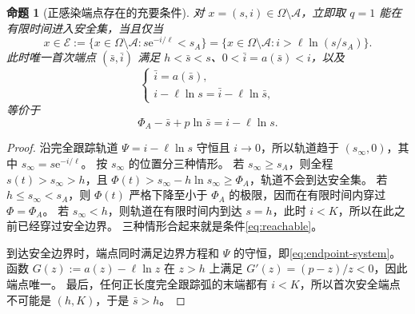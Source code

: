 \documentclass[11pt,a4paper,UTF8]{ctexart}
\newtheorem{proposition}[theorem]{命题}
\theoremstyle{definition}
\newcommand{\Acal}{\mathcal A}
\newcommand{\e}{\mathrm e}
\begin{document}
\begin{proposition}[正感染端点存在的充要条件]
\label{prop:reachable}
对 $x=(s,i)\in\Omega\setminus\Acal$，立即取 $q=1$ 能在有限时间进入安全集，当且仅当
\begin{equation}
x\in\mathcal E:=\{x\in\Omega\setminus\Acal:s\e^{-i/\ell}<s_A\}
=\{x\in\Omega\setminus\Acal:i>\ell\ln(s/s_A)\}.
\label{eq:reachable}
\end{equation}
此时唯一首次端点 $(\bar s,\bar i)$ 满足 $h<\bar s<s$、$0<\bar i=a(\bar s)<i$，以及
\begin{equation}
\begin{cases}
\bar i=a(\bar s),\\ i-\ell\ln s=\bar i-\ell\ln\bar s,
\end{cases}
\label{eq:endpoint-system}
\end{equation}
等价于
\begin{equation}
\Phi_A-\bar s+p\ln\bar s=i-\ell\ln s.
\label{eq:endpoint-root}
\end{equation}
\end{proposition}
\begin{proof}
沿完全跟踪轨道 $\Psi=i-\ell\ln s$ 守恒且 $i\to0$，所以轨道趋于 $(s_\infty,0)$，其中 $s_\infty=s\e^{-i/\ell}$。
按 $s_\infty$ 的位置分三种情形。
若 $s_\infty\ge s_A$，则全程 $s(t)>s_\infty>h$，且 $\Phi(t)>s_\infty-h\ln s_\infty\ge\Phi_A$，轨道不会到达安全集。
若 $h\le s_\infty<s_A$，则 $\Phi(t)$ 严格下降至小于 $\Phi_A$ 的极限，因而在有限时间内穿过 $\Phi=\Phi_A$。
若 $s_\infty<h$，则轨道在有限时间内到达 $s=h$，此时 $i<K$，所以在此之前已经穿过安全边界。
三种情形合起来就是条件\eqref{eq:reachable}。

到达安全边界时，端点同时满足边界方程和 $\Psi$ 的守恒，即\eqref{eq:endpoint-system}。
函数 $G(z):=a(z)-\ell\ln z$ 在 $z>h$ 上满足 $G'(z)=(p-z)/z<0$，因此端点唯一。
最后，任何正长度完全跟踪弧的末端都有 $i<K$，所以首次安全端点不可能是 $(h,K)$，于是 $\bar s>h$。
\end{proof}
\end{document}
